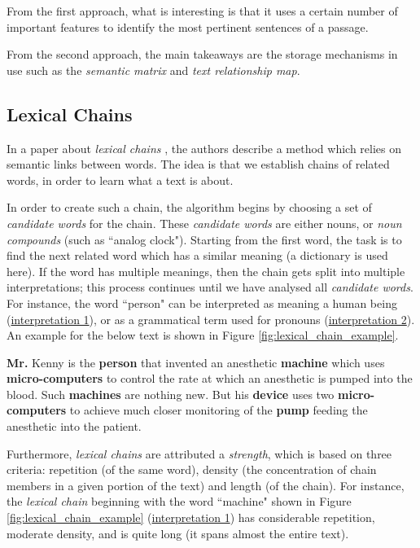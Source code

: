 \mbox{}

From the first approach, what is interesting is that it uses a certain number of important features to identify the most pertinent sentences of a passage.

From the second approach, the main takeaways are the storage mechanisms in use such as the \textit{semantic matrix} and \textit{text relationship map}.

\subsection{Lexical Chains}

In a paper about \textit{lexical chains} \cite{barzilay_using_1997}, the authors describe a method which relies on semantic links between words. The idea is that we establish chains of related words, in order to learn what a text is about.

In order to create such a chain, the algorithm begins by choosing a set of \textit{candidate words} for the chain. These \textit{candidate words} are either nouns, or \textit{noun compounds} (such as ``analog clock"). Starting from the first word, the task is to find the next related word which has a similar meaning (a dictionary is used here). If the word has multiple meanings, then the chain gets split into multiple interpretations; this process continues until we have analysed all \textit{candidate words}.  For instance, the word ``person" can be interpreted as meaning a human being (\underline{interpretation 1}), or as a grammatical term used for pronouns (\underline{interpretation 2}). An example for the below text is shown in Figure \ref{fig:lexical_chain_example}.

\begin{displayquote}
\textbf{Mr.} Kenny is the \textbf{person} that invented an anesthetic \textbf{machine} which uses \textbf{micro-computers} to control the rate at which an anesthetic is pumped into the blood. Such \textbf{machines} are nothing new. But his \textbf{device} uses two \textbf{micro-computers} to achieve much closer monitoring of the \textbf{pump} feeding the anesthetic into the patient. \cite{barzilay_using_1997}
\end{displayquote}

Furthermore, \textit{lexical chains} are attributed a \textit{strength}, which is based on three criteria: repetition (of the same word), density (the concentration of chain members in a given portion of the text) and length (of the chain). For instance, the \textit{lexical chain} beginning with the word ``machine" shown in Figure \ref{fig:lexical_chain_example} (\underline{interpretation 1}) has considerable repetition, moderate density, and is quite long (it spans almost the entire text).

